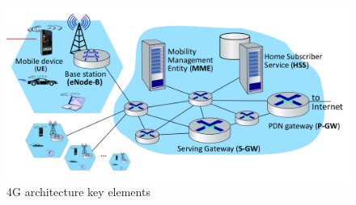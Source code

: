 \begin{figure}[htbp]
   \centering
   \includegraphics{images/4g_architecture.png}
   \caption{4G architecture key elements}
   \label{fig:4g_architecture}
\end{figure}

